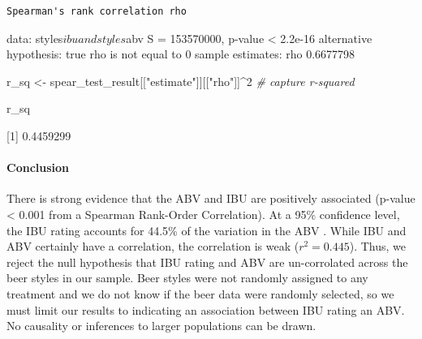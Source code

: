 \documentclass[]{article}
\newenvironment{Shaded}{\begin{snugshade}}{\end{snugshade}}
\newcommand{\KeywordTok}[1]{\textcolor[rgb]{0.13,0.29,0.53}{\textbf{#1}}}
\newcommand{\DataTypeTok}[1]{\textcolor[rgb]{0.13,0.29,0.53}{#1}}
\newcommand{\DecValTok}[1]{\textcolor[rgb]{0.00,0.00,0.81}{#1}}
\newcommand{\StringTok}[1]{\textcolor[rgb]{0.31,0.60,0.02}{#1}}
\newcommand{\CommentTok}[1]{\textcolor[rgb]{0.56,0.35,0.01}{\textit{#1}}}
\newcommand{\OtherTok}[1]{\textcolor[rgb]{0.56,0.35,0.01}{#1}}
\newcommand{\OperatorTok}[1]{\textcolor[rgb]{0.81,0.36,0.00}{\textbf{#1}}}
\newcommand{\NormalTok}[1]{#1}
\let\oldparagraph\paragraph
\renewcommand{\paragraph}[1]{\oldparagraph{#1}\mbox{}}
\begin{document}
\begin{Shaded}
\end{Shaded}

\begin{verbatim}
Spearman's rank correlation rho
\end{verbatim}

data: styles\(ibu and styles\)abv S = 153570000, p-value \textless{}
2.2e-16 alternative hypothesis: true rho is not equal to 0 sample
estimates: rho 0.6677798

\begin{Shaded}
\begin{Highlighting}[]
\NormalTok{r_sq <-}\StringTok{ }\NormalTok{spear_test_result[[}\StringTok{"estimate"}\NormalTok{]][[}\StringTok{"rho"}\NormalTok{]]}\OperatorTok{^}\DecValTok{2} \CommentTok{# capture r-squared}

\NormalTok{r_sq}
\end{Highlighting}
\end{Shaded}

{[}1{]} 0.4459299

\paragraph{Conclusion}\label{conclusion}

There is strong evidence that the ABV and IBU are positively associated
(p-value \textless{} 0.001 from a Spearman Rank-Order Correlation). At a
95\% confidence level, the IBU rating accounts for 44.5\% of the
variation in the ABV . While IBU and ABV certainly have a correlation,
the correlation is weak (\(r^2 = 0.445\)). Thus, we reject the null
hypothesis that IBU rating and ABV are un-corrolated across the beer
styles in our sample. Beer styles were not randomly assigned to any
treatment and we do not know if the beer data were randomly selected, so
we must limit our results to indicating an association between IBU
rating an ABV. No causality or inferences to larger populations can be
drawn.
\end{document}
